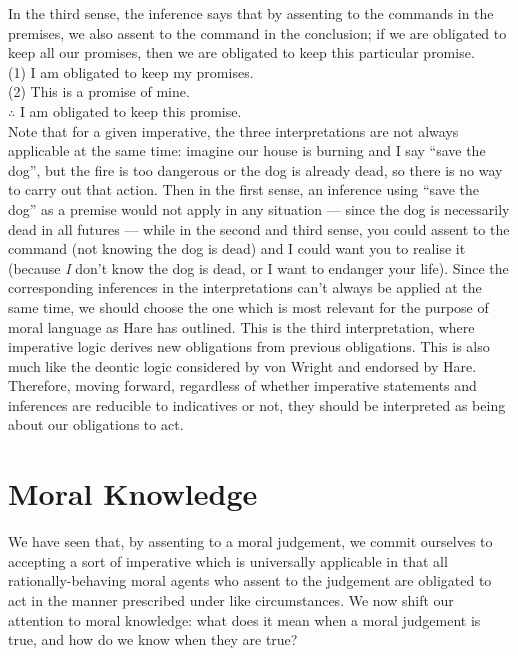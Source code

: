 \documentclass[12pt]{article}
\begin{document}
In the third sense, the inference says that by assenting to the commands in the premises, we also assent to the command in the conclusion; if we are obligated to keep all our promises, then we are obligated to keep this particular promise.\\

(1) I am obligated to keep my promises.\\
\indent
(2) This is a promise of mine.\\
\indent
$\therefore$ I am obligated to keep this promise.\\

Note that for a given imperative, the three interpretations are not always applicable at the same time: imagine our house is burning and I say ``save the dog'', but the fire is too dangerous or the dog is already dead, so there is no way to carry out that action. Then in the first sense, an inference using ``save the dog'' as a premise would not apply in any situation --- since the dog is necessarily dead in all futures --- while in the second and third sense, you could assent to the command (not knowing the dog is dead) and I could want you to realise it (because \textit{I} don't know the dog is dead, or I want to endanger your life). Since the corresponding inferences in the interpretations can't always be applied at the same time, we should choose the one which is most relevant for the purpose of moral language as Hare has outlined. This is the third interpretation, where imperative logic derives new obligations from previous obligations. This is also much like the deontic logic considered by von Wright and endorsed by Hare. Therefore, moving forward, regardless of whether imperative statements and inferences are reducible to indicatives or not, they should be interpreted as being about our obligations to act.

\section{Moral Knowledge}

We have seen that, by assenting to a moral judgement, we commit ourselves to accepting a sort of imperative which is universally applicable in that all rationally-behaving moral agents who assent to the judgement are obligated to act in the manner prescribed under like circumstances. We now shift our attention to moral knowledge: what does it mean when a moral judgement is true, and how do we know when they are true?
\end{document}
